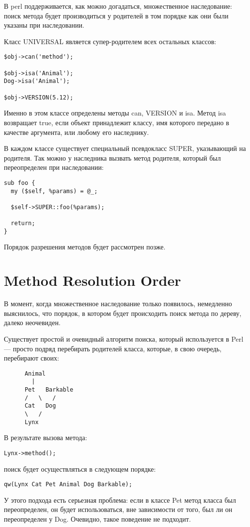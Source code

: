 В perl поддерживается, как можно догадаться, множественное наследование: поиск метода будет производиться у родителей в том порядке как они были указаны при наследовании.

Класс UNIVERSAL является супер-родителем всех остальных классов:
\begin{verbatim}
$obj->can('method');

$obj->isa('Animal');
Dog->isa('Animal');

$obj->VERSION(5.12);
\end{verbatim}
Именно в этом классе определены методы can, VERSION и isa. Метод isa возвращает true, если объект принадлежит классу, имя которого передано в качестве аргумента, или любому его наследнику.

В каждом классе существует специальный псевдокласс SUPER, указывающий на родителя. Так можно у наследника вызвать метод родителя, который был переопределен при наследовании:
\begin{verbatim}
sub foo {
  my ($self, %params) = @_;

  $self->SUPER::foo(%params);

  return;
}
\end{verbatim}
Порядок разрешения методов будет рассмотрен позже.

\section{Method Resolution Order}%
В момент, когда множественное наследование только появилось, немедленно выяснилось, что порядок, в котором будет происходить поиск метода по дереву, далеко неочевиден.

Существует простой и очевидный алгоритм поиска, который используется в Perl --- просто подряд перебирать родителей класса, которые, в свою очередь, перебирают своих:
\begin{verbatim}
      Animal
        |
      Pet   Barkable
      /   \   /
      Cat   Dog
      \   /
      Lynx
\end{verbatim}
В результате вызова метода:
\begin{verbatim}
Lynx->method();
\end{verbatim}
поиск будет осуществляться в следующем порядке:
\begin{verbatim}
qw(Lynx Cat Pet Animal Dog Barkable);
\end{verbatim}
У этого подхода есть серьезная проблема: если в классе Pet метод класса был переопределен, он будет использоваться, вне зависимости от того, был ли он переопределен у Dog. Очевидно, такое поведение не подходит.

